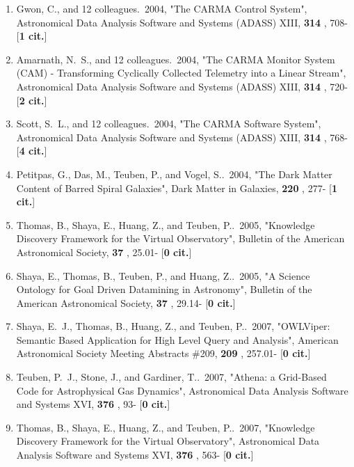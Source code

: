 \documentclass[11pt,letterpaper]{article}
\begin{document}
\begin{enumerate}[resume,label=\textbf{\arabic*}.]
\item  
Gwon, C., and 12 colleagues.\  2004,  "The CARMA Control System", 
Astronomical Data Analysis Software and Systems (ADASS) XIII,  {\bf 314} , 
708- [{\bf 1 cit.}] 

\item  
Amarnath, N.~S., and 12 colleagues.\  2004,  "The CARMA Monitor System 
(CAM) - Transforming Cyclically Collected Telemetry into a Linear Stream", 
Astronomical Data Analysis Software and Systems (ADASS) XIII,  {\bf 314} , 
720- [{\bf 2 cit.}] 

\item  
Scott, S.~L., and 12 colleagues.\  2004,  "The CARMA Software System", 
Astronomical Data Analysis Software and Systems (ADASS) XIII,  {\bf 314} , 
768- [{\bf 4 cit.}] 

\item  
Petitpas, G., Das, M., Teuben, P., and Vogel, S..\  2004,  "The Dark Matter 
Content of Barred Spiral Galaxies", Dark Matter in Galaxies,  {\bf 220} , 
277- [{\bf 1 cit.}] 

\item  
Thomas, B., Shaya, E., Huang, Z., and Teuben, P..\  2005,  "Knowledge 
Discovery Framework for the Virtual Observatory", Bulletin of the American 
Astronomical Society,  {\bf 37} , 25.01- [{\bf 0 cit.}] 

\item  
Shaya, E., Thomas, B., Teuben, P., and Huang, Z..\  2005,  "A Science 
Ontology for Goal Driven Datamining in Astronomy", Bulletin of the American 
Astronomical Society,  {\bf 37} , 29.14- [{\bf 0 cit.}] 

\item  
Shaya, E.~J., Thomas, B., Huang, Z., and Teuben, P..\  2007,  "OWLViper: 
Semantic Based Application for High Level Query and Analysis", American 
Astronomical Society Meeting Abstracts \#209,  {\bf 209} , 257.01- [{\bf 0 
cit.}] 

\item  
Teuben, P.~J., Stone, J., and Gardiner, T..\  2007,  "Athena: a Grid-Based 
Code for Astrophysical Gas Dynamics", Astronomical Data Analysis Software 
and Systems XVI,  {\bf 376} , 93- [{\bf 0 cit.}] 

\item  
Thomas, B., Shaya, E., Huang, Z., and Teuben, P..\  2007,  "Knowledge 
Discovery Framework for the Virtual Observatory", Astronomical Data 
Analysis Software and Systems XVI,  {\bf 376} , 563- [{\bf 0 cit.}] 


\end{enumerate}
\end{document}
